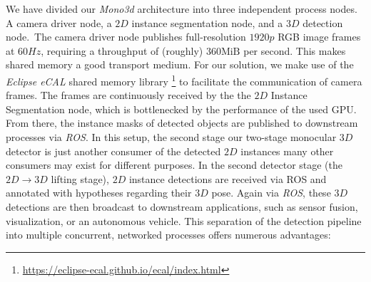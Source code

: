 We have divided our \textit{Mono3d} architecture into three independent process nodes.
A camera driver node, a $2D$ instance segmentation node, and a $3D$ detection node.\ The camera driver node publishes full-resolution $1920p$ RGB image frames at $60Hz$, requiring a throughput of (roughly) $360 \text{MiB}$ per second.
This makes shared memory a good transport medium.
For our solution, we make use of the \textit{Eclipse eCAL} shared memory library \footnote{\hyperlink{https://eclipse-ecal.github.io/ecal/index.html}{https://eclipse-ecal.github.io/ecal/index.html}} to facilitate the communication of camera frames.
The frames are continuously received by the the $2D$ Instance Segmentation node, which is bottlenecked by the performance of the used GPU.
From there, the instance masks of detected objects are published to downstream processes via \textit{ROS}.
In this setup, the second stage our two-stage monocular $3D$ detector is just another consumer of the detected $2D$ instances \textemdash many other consumers may exist for different purposes.
In the second detector stage (the $2D \rightarrow 3D$ lifting stage), $2D$ instance detections are received via ROS and annotated with hypotheses regarding their $3D$ pose.
Again via \textit{ROS}, these $3D$ detections are then broadcast to downstream applications, such as sensor fusion, visualization, or an autonomous vehicle.
This separation of the detection pipeline into multiple concurrent, networked processes offers numerous advantages:

